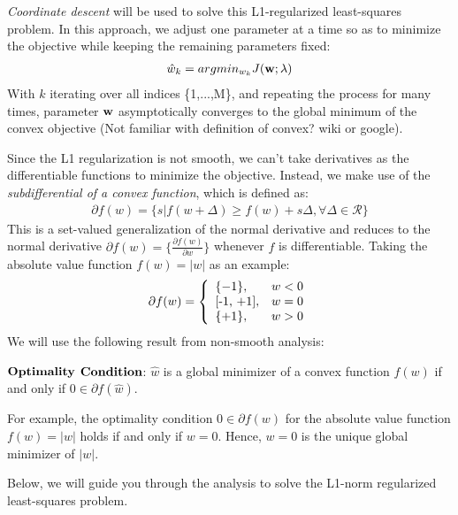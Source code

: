 \documentclass{article}
\theoremstyle{definition}
\theoremstyle{definition}
\theoremstyle{remark}
\begin{document}
\emph{Coordinate descent} will be used to solve this L1-regularized least-squares problem. In this approach, we adjust one parameter at a time so as to minimize the objective while keeping the remaining parameters fixed:
\begin{eqnarray}
\hat{w}_{k}=argmin_{w_{k}}J(\bold{w};\lambda)
\end{eqnarray}
With $k$ iterating over all indices \{1,...,M\}, and repeating the process for many times, parameter $\bold{w}$ asymptotically converges to the global minimum of the convex objective (Not familiar with definition of convex? wiki or google).

Since the L1 regularization is not smooth, we can't take derivatives as the differentiable functions to minimize the objective. Instead, we make use of the \emph{subdifferential of a convex function}, which is defined as:
\begin{eqnarray}
\partial f(w)=\{s|f(w+\Delta)\geq f(w)+s\Delta, \forall \Delta\in\mathcal{R}\}
\end{eqnarray}
This is a set-valued generalization of the normal derivative and reduces to the normal derivative $\partial f(w)=\{\frac{\partial f(w)}{\partial w}\}$ whenever $f$ is differentiable. Taking the absolute value function $f(w)=|w|$ as an example:
\begin{displaymath}
\partial f(w)= \left\{ \begin{array}{ll}
\{-1\}, & \textrm{$w<0$} \\
$[-1, +1]$, & \textrm{$w=0$} \\
\{+1\}, & \textrm{$w>0$}
\end{array} \right.
\end{displaymath}
We will use the following result from non-smooth analysis:

$\bold{Optimality}$ $\bold{Condition}$: $\hat{w}$ is a global minimizer of a convex function $f(w)$ if and only if $0\in \partial f(\hat{w})$.

For example, the optimality condition $0 \in \partial f(w)$ for the absolute value function $f(w)=|w|$ holds if and only if $w=0$. Hence, $w=0$ is the unique global minimizer of $|w|$.

Below, we will guide you through the analysis to solve the L1-norm regularized least-squares problem.
\end{document}
